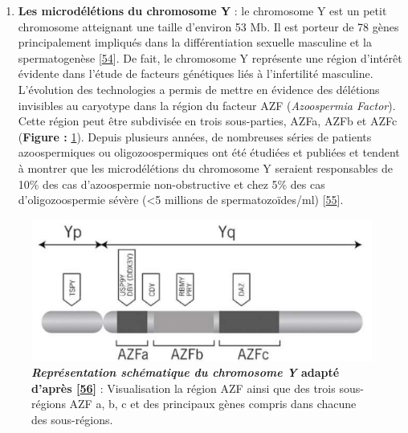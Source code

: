 \documentclass[12pt,a4paper,twoside]{ugathesis}
\providecommand{\tightlist}{%
  \setlength{\itemsep}{0pt}\setlength{\parskip}{0pt}}
\theoremstyle{definition}
\theoremstyle{definition}
\theoremstyle{definition}
\theoremstyle{remark}
\begin{document}
\begin{enumerate}
\def\labelenumi{\arabic{enumi}.}
\tightlist
\item
  \textbf{Les microdélétions du chromosome Y} : le chromosome Y est un
  petit chromosome atteignant une taille d'environ 53 Mb. Il est porteur
  de 78 gènes principalement impliqués dans la différentiation sexuelle
  masculine et la spermatogenèse
  {[}\protect\hyperlink{ref-Skaletsky2003}{54}{]}. De fait, le
  chromosome Y représente une région d'intérêt évidente dans l'étude de
  facteurs génétiques liés à l'infertilité masculine. L'évolution des
  technologies a permis de mettre en évidence des délétions invisibles
  au caryotype dans la région du facteur AZF (\emph{Azoospermia
  Factor}). Cette région peut être subdivisée en trois sous-parties,
  AZFa, AZFb et AZFc (\textbf{Figure :} \ref{fig:chry}). Depuis
  plusieurs années, de nombreuses séries de patients azoospermiques ou
  oligozoospermiques ont été étudiées et publiées et tendent à montrer
  que les microdélétions du chromosome Y seraient responsables de 10\%
  des cas d'azoospermie non-obstructive et chez 5\% des cas
  d'oligozoospermie sévère (\textless{}5 millions de spermatozoïdes/ml)
  {[}\protect\hyperlink{ref-Hotaling2014}{55}{]}.
\end{enumerate}

\newpage

\begin{figure}

{\centering \includegraphics[scale=.45]{figure/chromozomeY} 

}

\caption[Représentation schématique du chromosome Y]{\textbf{\emph{Représentation schématique du chromosome Y}
adapté d'après {[}\protect\hyperlink{ref-OFlynnOBrien2010}{56}{]}} :
Visualisation la région AZF ainsi que des trois sous-régions AZF a, b, c
et des principaux gènes compris dans chacune des sous-régions.}\label{fig:chry}
\end{figure}
\end{document}
